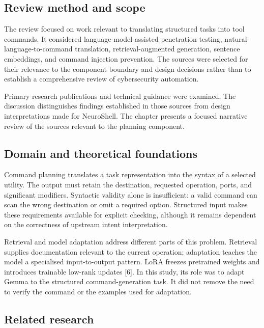 \documentclass[
]{article}
\begin{document}
\hypertarget{review-method-and-scope}{%
\subsection{\texorpdfstring{ Review method and
scope}{ Review method and scope}}\label{review-method-and-scope}}

The review focused on work relevant to translating structured tasks into
tool commands. It considered language-model-assisted penetration
testing, natural-language-to-command translation, retrieval-augmented
generation, sentence embeddings, and command injection prevention. The
sources were selected for their relevance to the component boundary and
design decisions rather than to establish a comprehensive review of
cybersecurity automation.

Primary research publications and technical guidance were examined. The
discussion distinguishes findings established in those sources from
design interpretations made for NeuroShell. The chapter presents a
focused narrative review of the sources relevant to the planning
component.

\hypertarget{domain-and-theoretical-foundations}{%
\subsection{\texorpdfstring{ Domain and theoretical
foundations}{ Domain and theoretical foundations}}\label{domain-and-theoretical-foundations}}

Command planning translates a task representation into the syntax of a
selected utility. The output must retain the destination, requested
operation, ports, and significant modifiers. Syntactic validity alone is
insufficient: a valid command can scan the wrong destination or omit a
required option. Structured input makes these requirements available for
explicit checking, although it remains dependent on the correctness of
upstream intent interpretation.

Retrieval and model adaptation address different parts of this problem.
Retrieval supplies documentation relevant to the current operation;
adaptation teaches the model a specialised input-to-output pattern. LoRA
freezes pretrained weights and introduces trainable low-rank updates
{[}6{]}. In this study, its role was to adapt Gemma to the structured
command-generation task. It did not remove the need to verify the
command or the examples used for adaptation.

\hypertarget{related-research}{%
\subsection{Related research}\label{related-research}}
\end{document}
